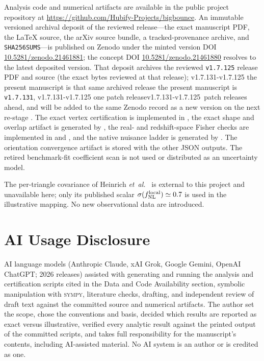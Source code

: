 \documentclass[aps,prd,twocolumn,superscriptaddress,showpacs,preprintnumbers,nofootinbib,longbibliography,floatfix]{revtex4-2}
\makeatletter
\newcommand{\fnl}{f_{\rm NL}}
\newcommand{\etal}{\textit{et~al.}}
\newcommand{\paperVersion}{v1.7.131}
\newcommand{\depositVersion}{v1.7.125}
\def\bb@afterDots#1.#2.#3\@nil{#3}            %
\newcommand{\patchOf}[1]{\expandafter\bb@afterDots#1\@nil}
\newcommand{\bb@patchDelta}{\numexpr\patchOf{\paperVersion}-\patchOf{\depositVersion}\relax}
\newcommand{\depositRelation}{%
  \ifnum\bb@patchDelta=0
    the present manuscript is that same archived release%
  \else
    the present manuscript is \texttt{\paperVersion}, %
    \ifnum\bb@patchDelta=1 one patch release\else\the\bb@patchDelta\ patch releases\fi\ %
    ahead, and will be added to the same Zenodo record as a new version on the
    next re-stage%
  \fi}
\makeatother
\begin{document}
Analysis code and numerical artifacts are available in the public project repository at \url{https://github.com/Hubify-Projects/bigbounce}. An immutable versioned archival deposit of the reviewed release---the exact manuscript PDF, the \LaTeX{} source, the arXiv source bundle, a tracked-provenance archive, and \texttt{SHA256SUMS}---is published on Zenodo under the minted version DOI \href{https://doi.org/10.5281/zenodo.21461881}{10.5281/zenodo.21461881}; the concept DOI \href{https://doi.org/10.5281/zenodo.21461880}{10.5281/zenodo.21461880} resolves to the latest deposited version. That deposit archives the reviewed \texttt{\depositVersion} release PDF and source (the exact bytes reviewed at that release); \depositRelation. The exact vertex certification is implemented in , the exact shape and overlap artifact is generated by , the real- and redshift-space Fisher checks are implemented in  and , and the native nuisance ladder is generated by . The orientation convergence artifact is stored with the other JSON outputs. The retired benchmark-fit coefficient scan is not used or distributed as an uncertainty model.

The per-triangle covariance of Heinrich \etal~\cite{Heinrich:2023} is external to this project and unavailable here; only its published scalar $\sigma(\fnl^{\rm local})\simeq0.7$ is used in the illustrative mapping. No new observational data are introduced.

\section*{AI Usage Disclosure}

AI language models (Anthropic Claude, xAI Grok, Google Gemini, OpenAI ChatGPT; 2026 releases) assisted with generating and running the analysis and certification scripts cited in the Data and Code Availability section, symbolic manipulation with \textsc{sympy}, literature checks, drafting, and independent review of draft text against the committed source and numerical artifacts. The author set the scope, chose the conventions and basis, decided which results are reported as exact versus illustrative, verified every analytic result against the printed output of the committed scripts, and takes full responsibility for the manuscript's contents, including AI-assisted material. No AI system is an author or is credited as one.
\end{document}
